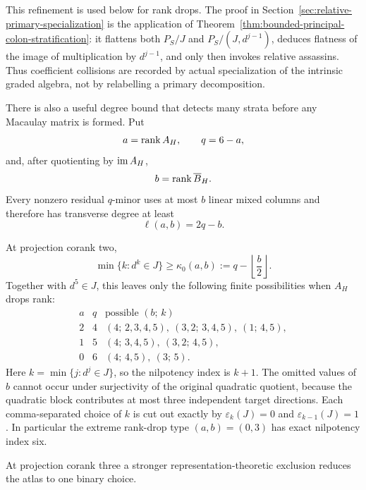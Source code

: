 This refinement is used below for rank drops.  The proof in
Section~\ref{sec:relative-primary-specialization} is the application of
Theorem~\ref{thm:bounded-principal-colon-stratification}: it flattens
both \(P_S/J\) and \(P_S/(J,d^{j-1})\), deduces flatness of the image
of multiplication by \(d^{j-1}\), and only then invokes relative
assassins.  Thus coefficient collisions are
recorded by actual specialization of the intrinsic graded algebra,
not by relabelling a primary decomposition.

There is also a useful degree bound that detects many strata before
any Macaulay matrix is formed.  Put
\[
 a=\operatorname{rank} A_H,\qquad q=6-a,
\]
and, after quotienting by \(\operatorname{im} A_H\),
\[
 b=\operatorname{rank}\overline B_H.
\]
Every nonzero residual \(q\)-minor uses at most \(b\) linear mixed
columns and therefore has transverse degree at least
\begin{equation}\label{eq:minimal-transverse-degree}
 \ell(a,b)=2q-b.
\end{equation}

\begin{proposition}
\label{prop:rankdrop-coranktwo-depth}
At projection corank two,
\begin{equation}\label{eq:coranktwo-lower-bound}
 \min\{k:d^k\in J\}\ge
 \kappa_0(a,b):=
 q-\left\lfloor\frac b2\right\rfloor.
\end{equation}
Together with \(d^5\in J\), this leaves only the following finite
possibilities when \(A_H\) drops rank:
\[
\begin{array}{c|c|c}
a&q&\text{possible }(b;\,k)\\ \hline
2&4&(4;\,2,3,4,5),\ (3,2;\,3,4,5),\ (1;\,4,5),\\
1&5&(4;\,3,4,5),\ (3,2;\,4,5),\\
0&6&(4;\,4,5),\ (3;\,5).
\end{array}
\]
Here \(k=\min\{j:d^j\in J\}\), so the nilpotency index is \(k+1\).
The omitted values of \(b\) cannot occur under surjectivity of the
original quadratic quotient, because the quadratic block contributes
at most three independent target directions.
Each comma-separated choice of \(k\) is cut out exactly by
\(\varepsilon_k(J)=0\) and
\(\varepsilon_{k-1}(J)=1\).
In particular the extreme rank-drop type \((a,b)=(0,3)\) has exact
nilpotency index six.
\end{proposition}

At projection corank three a stronger representation-theoretic
exclusion reduces the atlas to one binary choice.

